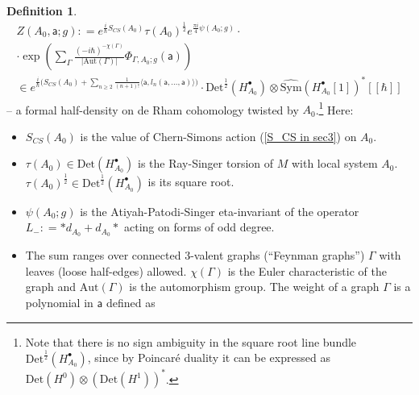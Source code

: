 \documentclass[11pt,a4paper]{amsart}
\theoremstyle{plain} %
\theoremstyle{definition}
\newtheorem{defn}[thm]{Definition}
\theoremstyle{remark}
\newcommand{\g}{\mathfrak{g}}
\newcommand{\mr}{\mathrm}
\newcommand{\sfa}{\mathsf{a}}
\newcommand{\bt}{\bullet}
\newcommand{\wh}{\widehat}
\begin{document}
{\begin{defn}
\begin{multline}\label{eq: Z def}
    Z(A_0,\sfa;g)\colon=e^{\frac{i}{\hbar}S_{CS}(A_0)} \tau(A_0)^\frac{1}{2} e^{\frac{\pi i}{4}\psi(A_0;g)}\cdot\\
    \cdot \exp \left(\sum_\Gamma \frac{(-i\hbar)^{-\chi(\Gamma)}}{|\mr{Aut}(\Gamma)|}\Phi_{\Gamma,A_0;g}(\sfa)\right) \\ 
    \in 
    e^{\frac{i}{\hbar}\big(S_{CS}(A_0)+\sum_{n\geq 2}\frac{1}{(n+1)!}\langle \sfa,l_n(\sfa,\ldots,\sfa)\rangle\big)}\cdot\mr{Det}^\frac12(H^\bt_{A_0})\otimes \wh{\mr{Sym}}(H^\bt_{A_0}[1])^*[[\hbar]]
\end{multline}
-- a formal half-density on de Rham cohomology twisted by $A_0$.\footnote{Note that there is no sign ambiguity in the square root line bundle $\mr{Det}^{\frac12}(H^\bt_{A_0})$, since by Poincar\'e duality it can be expressed as $\mr{Det}(H^0)\otimes (\mr{Det}(H^1))^*$.} 
Here:
\begin{itemize}
   \item $S_{CS}(A_0)$ is the value of Chern-Simons action (\ref{S_CS in sec3}) on $A_0$.
    \item $\tau(A_0)\in \mr{Det}(H^\bt_{A_0})$ is the Ray-Singer torsion of $M$ with local system $A_0$. $\tau(A_0)^{\frac12}\in \mr{Det}^{\frac12}(H^\bt_{A_0})$ is its square root.
    \item $\psi(A_0;g)$ is the Atiyah-Patodi-Singer eta-invariant of the %
    operator ${L_-\colon=*d_{A_0}+d_{A_0}*}$ acting on forms of odd degree.
    \item The sum ranges over connected 3-valent graphs (``Feynman graphs'') $\Gamma$ with leaves (loose half-edges) allowed. $\chi(\Gamma)$ is the Euler characteristic of the graph and $\mr{Aut}(\Gamma)$ is the automorphism group. The weight of a graph $\Gamma$ is a polynomial in $\sfa$ defined as 

\end{itemize}
\end{defn}}
\end{document}
